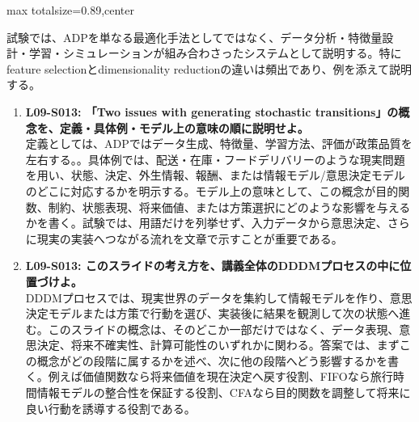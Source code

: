 \begin{minipage}[t]{0.58\textwidth}
\begin{adjustbox}{max totalsize={\textwidth}{0.89\textheight},center}
\begin{minipage}{\textwidth}
試験では、ADPを単なる最適化手法としてではなく、データ分析・特徴量設計・学習・シミュレーションが組み合わさったシステムとして説明する。特にfeature selectionとdimensionality reductionの違いは頻出であり、例を添えて説明する。\par{}\begin{enumerate}\item \textbf{L09-S013: 「Two issues with generating stochastic transitions」の概念を、定義・具体例・モデル上の意味の順に説明せよ。}\\定義としては、ADPではデータ生成、特徴量、学習方法、評価が政策品質を左右する。。具体例では、配送・在庫・フードデリバリーのような現実問題を用い、状態、決定、外生情報、報酬、または情報モデル/意思決定モデルのどこに対応するかを明示する。モデル上の意味として、この概念が目的関数、制約、状態表現、将来価値、または方策選択にどのような影響を与えるかを書く。試験では、用語だけを列挙せず、入力データから意思決定、さらに現実の実装へつながる流れを文章で示すことが重要である。\item \textbf{L09-S013: このスライドの考え方を、講義全体のDDDMプロセスの中に位置づけよ。}\\DDDMプロセスでは、現実世界のデータを集約して情報モデルを作り、意思決定モデルまたは方策で行動を選び、実装後に結果を観測して次の状態へ進む。このスライドの概念は、そのどこか一部だけではなく、データ表現、意思決定、将来不確実性、計算可能性のいずれかに関わる。答案では、まずこの概念がどの段階に属するかを述べ、次に他の段階へどう影響するかを書く。例えば価値関数なら将来価値を現在決定へ戻す役割、FIFOなら旅行時間情報モデルの整合性を保証する役割、CFAなら目的関数を調整して将来に良い行動を誘導する役割である。\end{enumerate}
\end{minipage}
\end{adjustbox}
\end{minipage}


